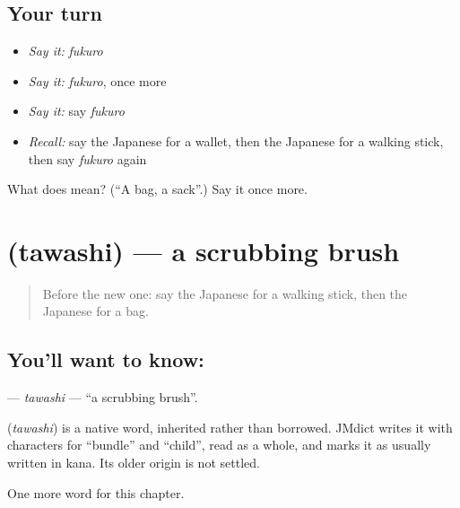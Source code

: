 \subsection*{Your turn}
\begin{itemize}
\raggedright
  \item \emph{Say it:} \emph{fukuro}
  \item \emph{Say it:} \emph{fukuro}, once more
  \item \emph{Say it:} say \emph{fukuro}
  \item \emph{Recall:} say the Japanese for a wallet, then the Japanese for a walking stick, then say \emph{fukuro} again
\end{itemize}

\begin{tcolorbox}[breakable,colback=teal!4,colframe=teal!35!black,title={Before you move on}]
What does  mean? (\textquotedblleft{}A bag, a sack\textquotedblright{}.) Say it once more.
\end{tcolorbox}
\section[\texorpdfstring{\ja{たわし} (tawashi)}{たわし (tawashi)}]{ (tawashi) — a scrubbing brush}

\label{lesson:JA-C99-tawashi}



\begin{quote}
Before the new one: say the Japanese for a walking stick, then the Japanese for a bag.
\end{quote}

\subsection*{You'll want to know: }
\textbf{} — \emph{tawashi} — \textquotedblleft{}a scrubbing brush\textquotedblright{}.

\begin{cousinweb}
\textbf{} (\emph{tawashi}) is a native word, inherited rather than borrowed. JMdict writes it with characters for \textquotedblleft{}bundle\textquotedblright{} and \textquotedblleft{}child\textquotedblright{}, read as a whole, and marks it as usually written in kana. Its older origin is not settled.
\end{cousinweb}

\begin{grammarlens}[title={What you've built}]
One more word for this chapter.
\end{grammarlens}

